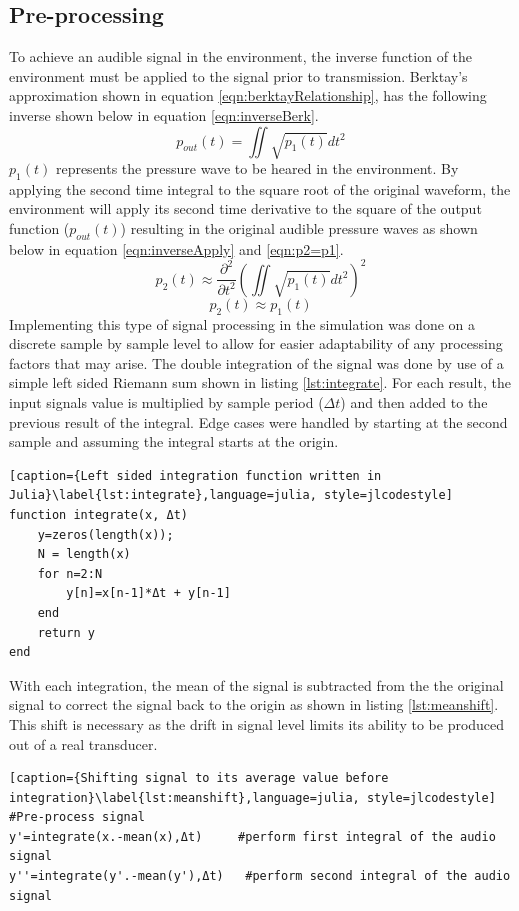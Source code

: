\subsection{Pre-processing}
To achieve an audible signal in the environment, the inverse function of the environment must be applied to the signal prior to transmission. Berktay's approximation \cite{berktay_1965} shown in equation \ref{eqn:berktayRelationship}, has the following inverse shown below in equation \ref{eqn:inverseBerk}.
\begin{equation}
    p_{out}(t) = \iint \sqrt{p_1(t)} dt^2
    \label{eqn:inverseBerk}
\end{equation}
$p_1(t)$ represents the pressure wave to be heared in the environment. By applying the second time integral to the square root of the original waveform, the environment will apply its second time derivative to the square of the output function ($p_{out}(t)$) resulting in the original audible pressure waves as shown below in equation \ref{eqn:inverseApply} and \ref{eqn:p2=p1}.
\begin{equation}
        p_2(t) \approx \frac{\partial^2}{\partial t^2}\left(\iint \sqrt{p_1(t)} dt^2\right)^2
        \label{eqn:inverseApply}
\end{equation}
\begin{equation}
        p_2(t) \approx p_1(t)
        \label{eqn:p2=p1}
\end{equation}
Implementing this type of signal processing in the simulation was done on a discrete sample by sample level to allow for easier adaptability of any processing factors that may arise. The double integration of the signal was done by use of a simple left sided Riemann sum shown in listing \ref{lst:integrate}. For each result, the input signals value is multiplied by sample period ($\Delta t$) and then added to the previous result of the integral. Edge cases were handled by starting at the second sample and assuming the integral starts at the origin.
\begin{lstlisting}[caption={Left sided integration function written in Julia}\label{lst:integrate},language=julia, style=jlcodestyle]
function integrate(x, Δt)
    y=zeros(length(x));
    N = length(x)
    for n=2:N
        y[n]=x[n-1]*Δt + y[n-1]
    end
    return y
end
\end{lstlisting}
With each integration, the mean of the signal is subtracted from the the original signal to correct the signal back to the origin as shown in listing \ref{lst:meanshift}. This shift is necessary as the drift in signal level limits its ability to be produced out of a real transducer.
\begin{lstlisting}[caption={Shifting signal to its average value before integration}\label{lst:meanshift},language=julia, style=jlcodestyle]
#Pre-process signal             
y'=integrate(x.-mean(x),Δt)     #perform first integral of the audio signal
y''=integrate(y'.-mean(y'),Δt)   #perform second integral of the audio signal
\end{lstlisting}


